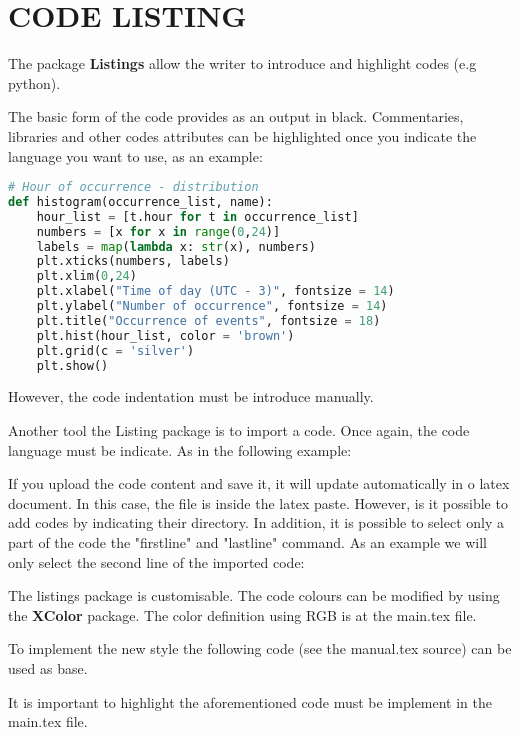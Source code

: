 \section{CODE LISTING}

 
The package \textbf{Listings} allow the writer to introduce and highlight codes (e.g python).

The basic form of the code provides as an output in black. Commentaries, libraries and other codes attributes can be highlighted once you indicate the language you want to use, as an example:

\begin{lstlisting}[language=Python]
# Hour of occurrence - distribution
def histogram(occurrence_list, name):
	hour_list = [t.hour for t in occurrence_list]
	numbers = [x for x in range(0,24)]
	labels = map(lambda x: str(x), numbers)
	plt.xticks(numbers, labels)
	plt.xlim(0,24)
	plt.xlabel("Time of day (UTC - 3)", fontsize = 14)
	plt.ylabel("Number of occurrence", fontsize = 14)
	plt.title("Occurrence of events", fontsize = 18)
	plt.hist(hour_list, color = 'brown')
	plt.grid(c = 'silver')
	plt.show()	
\end{lstlisting}

However, the code indentation must be introduce manually.

Another tool the Listing package is to import a code. Once again, the code language must be indicate. As in the following example:



If you upload the code content and save it, it will update automatically in o latex document. In this case, the file is inside the latex paste. However, is it possible to add codes by indicating their directory. In addition, it is possible to select only a part of the code the "firstline" and "lastline" command. As an example we will only select the second line of the imported code:



The listings package is customisable. The code colours can be modified by using the \textbf{XColor} package. The color definition using RGB is at the main.tex file.

To implement the new style the following code (see the manual.tex source) can be used as base.


\lstset{style=mystyle}

It is important to highlight the aforementioned code must be implement in the main.tex file. 




